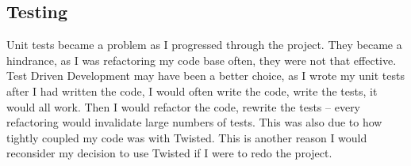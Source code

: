 \documentclass[12pt,twoside,notitlepage]{report}
\begin{document}
%
%
%
%
%

\subsection*{Testing}

Unit tests became a problem as I progressed through the project. They became a hindrance, as I
was refactoring my code base often, they were not that effective. Test Driven Development may have
been a better choice, as I wrote my unit tests after I had written the code, I would often write
the code, write the tests, it would all work. Then I would refactor the code, rewrite the tests --
every refactoring would invalidate large numbers of tests. This was also due to how tightly
coupled my code was with Twisted. This is another reason I would reconsider my decision to use
Twisted if I were to redo the project.
\end{document}
